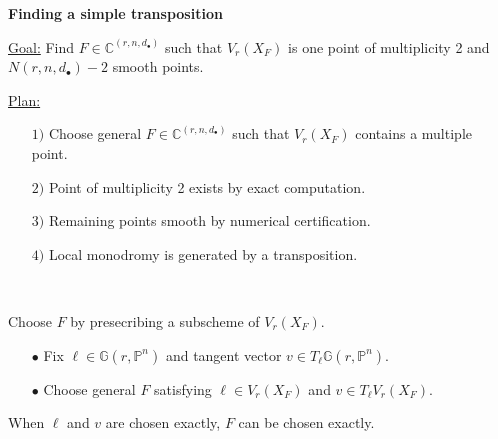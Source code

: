 \documentclass[final]{beamer}
\theoremstyle{thrm}
\newcommand{\blue}[1]{{\color{black!15!aggiemaroon}\underline{#1}}}
\newcommand{\headft}[1]{
\begin{center}
{\color{aggiemaroon}\textbf{\quad\LARGE{#1}\quad}}
\end{center}
}
\newcommand{\tallminipage}{\begin{minipage}{.025\textwidth}~\vspace{0pt}~\end{minipage}}
\begin{document}
\begin{frame}
\begin{minipage}[t]{.3\textwidth}

\headft{Finding a simple transposition}
\blue{Goal:} Find $F\in\mathbb{C}^{(r,n,d_\bullet)}$ such that $V_r(X_F)$ is one point of multiplicity 2 and $N(r,n,d_\bullet)-2$ smooth points.

\vspace{.1cm}

\blue{Plan:}
\begin{enumerate}
\item[$1)$] Choose general $F\in\mathbb{C}^{(r,n,d_\bullet)}$ such that $V_r(X_F)$ contains a multiple point.

\item[$2)$] Point of multiplicity 2 exists by exact computation.

\item[$3)$] Remaining points smooth by numerical certification.

\item[$4)$] Local monodromy is generated by a transposition.
\end{enumerate}
%
%

\vspace{1cm}


\end{minipage}
%
\tallminipage
\begin{minipage}[t]{.3\textwidth}
\vspace{.15cm} 
Choose $F$ by presecribing a subscheme of $V_r(X_F)$.
\begin{enumerate}
\item[$\bullet$] Fix $\ell\in\mathbb{G}(r,\mathbb{P}^n)$ and tangent vector $v\in T_\ell\mathbb{G}(r,\mathbb{P}^n)$. 

\item[$\bullet$] Choose general $F$ satisfying $\ell\in V_r(X_F)$ and $v\in T_\ell V_r(X_F)$.
\end{enumerate}

When $\ell$ and $v$ are chosen exactly, $F$ can be chosen exactly.


\end{minipage}
\end{frame}
\end{document}

